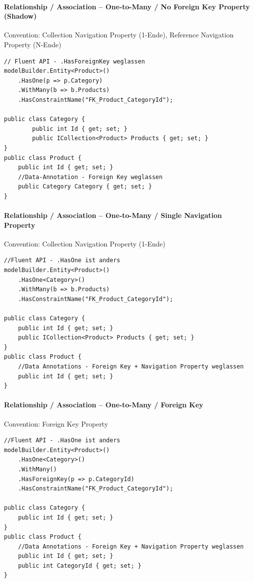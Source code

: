 \documentclass[
a4paper,
oneside,
10pt,
fleqn,
headsepline,
toc=listofnumbered, 
bibliography=totocnumbered]{scrartcl}
\begin{document}
\paragraph{Relationship / Association – One-to-Many / No Foreign Key Property (Shadow)}
Convention: Collection Navigation Property (1-Ende), Reference Navigation Property (N-Ende)
\begin{lstlisting}
// Fluent API - .HasForeignKey weglassen
modelBuilder.Entity<Product>()
    .HasOne(p => p.Category)
    .WithMany(b => b.Products)                          
    .HasConstraintName("FK_Product_CategoryId");

public class Category {
		public int Id { get; set; }
		public ICollection<Product> Products { get; set; }
}
public class Product {
    public int Id { get; set; }
    //Data-Annotation - Foreign Key weglassen
    public Category Category { get; set; }              
}
\end{lstlisting}

\paragraph{Relationship / Association – One-to-Many / Single Navigation Property} Convention: Collection Navigation Property (1-Ende)
\begin{lstlisting}
//Fluent API - .HasOne ist anders
modelBuilder.Entity<Product>()
    .HasOne<Category>()
    .WithMany(b => b.Products)
    .HasConstraintName("FK_Product_CategoryId");

public class Category {
    public int Id { get; set; }
    public ICollection<Product> Products { get; set; }
}
public class Product {
    //Data Annotations - Foreign Key + Navigation Property weglassen
    public int Id { get; set; }                         
}
\end{lstlisting}

\paragraph{Relationship / Association – One-to-Many / Foreign Key} Convention: Foreign Key Property
\begin{lstlisting}
//Fluent API - .HasOne ist anders
modelBuilder.Entity<Product>()
    .HasOne<Category>()
    .WithMany()
    .HasForeignKey(p => p.CategoryId)
    .HasConstraintName("FK_Product_CategoryId");

public class Category {
    public int Id { get; set; }
}
public class Product {
    //Data Annotations - Foreign Key + Navigation Property weglassen
    public int Id { get; set; }
	public int CategoryId { get; set; }
}
\end{lstlisting}
\end{document}
